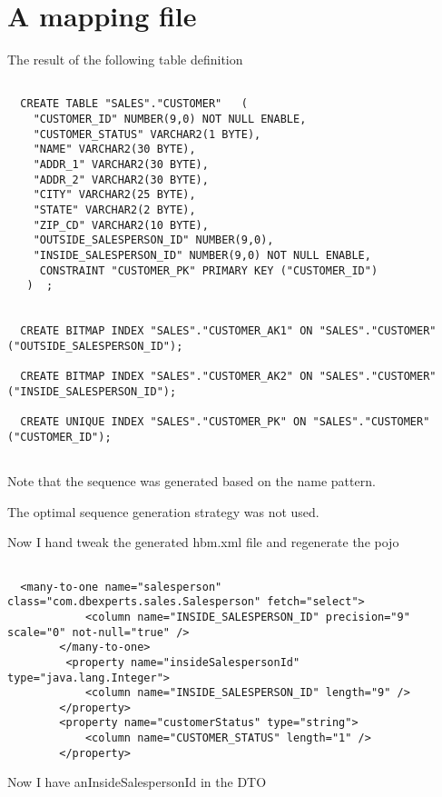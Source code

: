 \section{A mapping file}
The result of the following table definition
\begin{verbatim}

  CREATE TABLE "SALES"."CUSTOMER"   (	
	"CUSTOMER_ID" NUMBER(9,0) NOT NULL ENABLE, 
	"CUSTOMER_STATUS" VARCHAR2(1 BYTE), 
	"NAME" VARCHAR2(30 BYTE), 
	"ADDR_1" VARCHAR2(30 BYTE), 
	"ADDR_2" VARCHAR2(30 BYTE), 
	"CITY" VARCHAR2(25 BYTE), 
	"STATE" VARCHAR2(2 BYTE), 
	"ZIP_CD" VARCHAR2(10 BYTE), 
	"OUTSIDE_SALESPERSON_ID" NUMBER(9,0), 
	"INSIDE_SALESPERSON_ID" NUMBER(9,0) NOT NULL ENABLE, 
	 CONSTRAINT "CUSTOMER_PK" PRIMARY KEY ("CUSTOMER_ID")
   )  ;
 

  CREATE BITMAP INDEX "SALES"."CUSTOMER_AK1" ON "SALES"."CUSTOMER" ("OUTSIDE_SALESPERSON_ID");
 
  CREATE BITMAP INDEX "SALES"."CUSTOMER_AK2" ON "SALES"."CUSTOMER" ("INSIDE_SALESPERSON_ID");
 
  CREATE UNIQUE INDEX "SALES"."CUSTOMER_PK" ON "SALES"."CUSTOMER" ("CUSTOMER_ID");
 

\end{verbatim}
Note that the sequence was generated based on the name pattern.

The optimal sequence generation strategy was not used.


Now I hand tweak the generated hbm.xml file and regenerate the pojo
\begin{verbatim}

  <many-to-one name="salesperson" class="com.dbexperts.sales.Salesperson" fetch="select">
            <column name="INSIDE_SALESPERSON_ID" precision="9" scale="0" not-null="true" />
        </many-to-one>
         <property name="insideSalespersonId" type="java.lang.Integer">
            <column name="INSIDE_SALESPERSON_ID" length="9" />
        </property>
        <property name="customerStatus" type="string">
            <column name="CUSTOMER_STATUS" length="1" />
        </property>
\end{verbatim}

Now I have anInsideSalespersonId in the DTO

